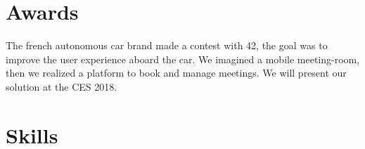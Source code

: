 \documentclass[a4paper]{deedy-resume} %
\begin{document}
\sectionspace %


\section{Awards}




\sectionspace %


\begin{description}[leftmargin=0pt]
\item The french autonomous car brand made a contest with 42, the goal was to improve the user experience aboard the car. We imagined a mobile meeting-room, then we realized a platform to book and manage meetings. We will present our solution at the CES 2018.
\end{description}
\sectionspace %

\sectionspace %


\section{Skills}
\end{document}
